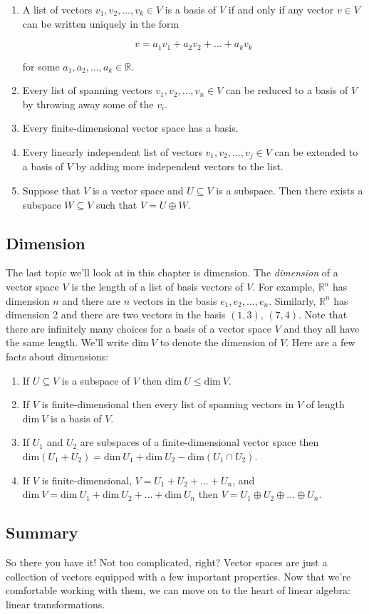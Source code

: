 \documentclass[12pt]{article}
\begin{document}
\begin{enumerate}
\item A list of vectors $v_1, v_2, \ldots, v_k \in V$ is a basis of $V$ if and only if any vector $v \in V$ can be written uniquely in the form

$$v = a_1 v_1 + a_2 v_2 + \ldots + a_k v_k$$

for some $a_1, a_2, \ldots, a_k \in \mathbb{R}$.
\item Every list of spanning vectors $v_1, v_2, \ldots, v_n \in V$ can be reduced to a basis of $V$ by throwing away some of the $v_i$.

\item Every finite-dimensional vector space has a basis.

\item Every linearly independent list of vectors $v_1, v_2, \ldots, v_j \in V$ can be extended to a basis of $V$ by adding more independent vectors to the list.

\item Suppose that $V$ is a vector space and $U \subseteq V$ is a subspace. Then there exists a subspace $W \subseteq V$ such that $V = U \oplus W$.
\end{enumerate}

\subsection*{Dimension}

The last topic we'll look at in this chapter is dimension. The \textit{dimension} of a vector space $V$ is the length of a list of basis vectors of $V$. For example, $\mathbb{R}^n$ has dimension $n$ and there are $n$ vectors in the basis $e_1, e_2, \ldots, e_n$. Similarly, $\mathbb{R}^n$ has dimension 2 and there are two vectors in the basis $(1, 3)$, $(7,4)$. Note that there are infinitely many choices for a basis of a vector space $V$ and they all have the same length. We'll write $\textrm{dim} \: V$ to denote the dimension of $V$. Here are a few facts about dimensions:

\begin{enumerate}
\item If $U \subseteq V$ is a subspace of $V$ then $\textrm{dim} \: U \leq \textrm{dim} \: V$.
\item If $V$ is finite-dimensional then every list of spanning vectors in $V$ of length $\textrm{dim} \: V$ is a basis of $V$.
\item If $U_1$ and $U_2$ are subspaces of a finite-dimensional vector space then $\textrm{dim} (U_1 + U_2) = \textrm{dim} \: U_1 + \textrm{dim} \: U_2 - \textrm{dim}( U_1 \cap U_2)$.
\item If $V$ is finite-dimensional, $V = U_1 + U_2 + \ldots + U_n$, and $\textrm{dim} \: V = \textrm{dim} \: U_1 + \textrm{dim} \: U_2 + \ldots + \textrm{dim} \: U_n$ then $V = U_1 \oplus U_2 \oplus \ldots \oplus U_n$.
\end{enumerate}


\subsection*{Summary}

So there you have it! Not too complicated, right? Vector spaces are just a collection of vectors equipped with a few important properties. Now that we're comfortable working with them, we can move on to the heart of linear algebra:  linear transformations.
\end{document}
